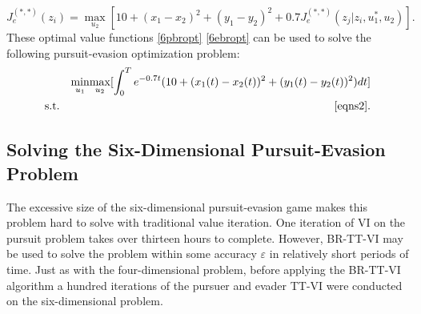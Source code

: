 \begin{equation}\label{6ebropt}
J_e^{(*,*)}(z_i)= \underset{u_2 }{\operatorname{max }}[10+(x_1-x_2)^2+(y_1-y_2)^2+0.7 J_e^{(*,*)}(z_j|z_i,u_1^*,u_2)].
\end{equation}    
These optimal value functions \ref{6pbropt} \ref{6ebropt} can be used to solve the following pursuit-evasion optimization problem:
\begin{eqnarray}\label{6opt}
&&\underset{u_1 }{\operatorname{min }}\underset{u_2 }{\operatorname{max }}[\int_{0}^{T}e^{-0.7t}(10+(x_1(t)-x_2(t))^2+(y_1(t)-y_2(t))^2)dt]\\
&\textnormal{s.t.}&\ref{eqns2}.
\end{eqnarray}

\subsection{Solving the Six-Dimensional Pursuit-Evasion Problem}
The excessive size of the six-dimensional pursuit-evasion game makes this problem hard to solve with traditional value iteration. One iteration of VI on the pursuit problem takes over thirteen hours to complete. However, BR-TT-VI may be used to solve the problem within some accuracy $\varepsilon$ in relatively short periods of time. Just as with the four-dimensional problem, before applying the BR-TT-VI algorithm a hundred iterations of the pursuer and evader TT-VI were conducted on the six-dimensional problem. 

